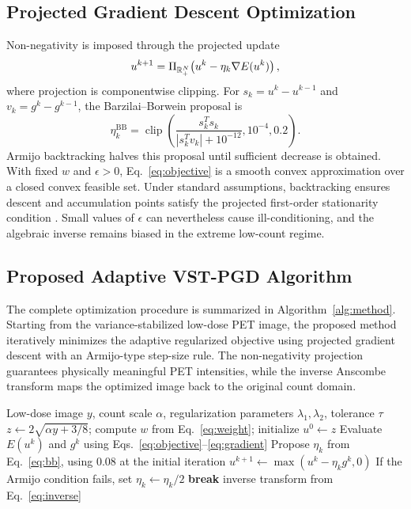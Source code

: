 \subsection{Projected Gradient Descent Optimization}
Non-negativity is imposed through the projected update
\begin{equation}
u^{k+1}=\Pi_{\mathbb{R}_+^N}\!\left(u^k-\eta_k\nabla E(u^k)\right),
\label{eq:pgd}
\end{equation}
where projection is componentwise clipping. For $s_k=u^k-u^{k-1}$ and $v_k=g^k-g^{k-1}$, the Barzilai--Borwein proposal is
\begin{equation}
\eta_k^{\mathrm{BB}}=\operatorname{clip}\left(
\frac{s_k^Ts_k}{|s_k^Tv_k|+10^{-12}},10^{-4},0.2\right).
\label{eq:bb}
\end{equation}
Armijo backtracking halves this proposal until sufficient decrease is obtained. With fixed $w$ and $\epsilon>0$, Eq.~\eqref{eq:objective} is a smooth convex approximation over a closed convex feasible set. Under standard assumptions, backtracking ensures descent and accumulation points satisfy the projected first-order stationarity condition \citep{bertsekas1999nonlinear}. Small values of $\epsilon$ can nevertheless cause ill-conditioning, and the algebraic inverse remains biased in the extreme low-count regime.

\subsection{Proposed Adaptive VST-PGD Algorithm}
The complete optimization procedure is summarized in Algorithm~\ref{alg:method}. Starting from the variance-stabilized low-dose PET image, the proposed method iteratively minimizes the adaptive regularized objective using projected gradient descent with an Armijo-type step-size rule. The non-negativity projection guarantees physically meaningful PET intensities, while the inverse Anscombe transform maps the optimized image back to the original count domain.

\begin{algorithm}[H]
\caption{Adaptive VST-PGD for Low-Dose PET Image Preprocessing}
\label{alg:method}
\begin{algorithmic}[1]
\REQUIRE Low-dose image $y$, count scale $\alpha$, regularization parameters $\lambda_1,\lambda_2$, tolerance $\tau$
\STATE $z\gets2\sqrt{\alpha y+3/8}$; compute $w$ from Eq.~\eqref{eq:weight}; initialize $u^0\gets z$
  \STATE Evaluate $E(u^k)$ and $g^k$ using Eqs.~\eqref{eq:objective}--\eqref{eq:gradient}
  \STATE Propose $\eta_k$ from Eq.~\eqref{eq:bb}, using $0.08$ at the initial iteration
  \REPEAT
    \STATE $u^{k+1}\gets\max(u^k-\eta_kg^k,0)$
    \STATE If the Armijo condition fails, set $\eta_k\gets\eta_k/2$
    \STATE \textbf{break}
  \ENDIF
\ENDFOR
\STATE \RETURN inverse transform from Eq.~\eqref{eq:inverse}
\end{algorithmic}
\end{algorithm}

